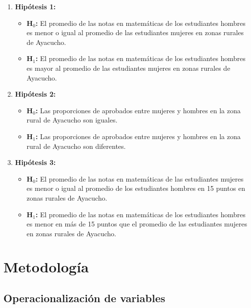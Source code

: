 \documentclass[
]{article}
\begin{document}
\begin{enumerate}
    \item \textbf{Hipótesis 1:}
    \begin{itemize}
        \item \textbf{H$_{0}$:} El promedio de las notas en matemáticas de los estudiantes hombres es menor o igual al promedio de las estudiantes mujeres en zonas rurales de Ayacucho.
        \item \textbf{H$_{1}$:} El promedio de las notas en matemáticas de los estudiantes hombres es mayor al promedio de las estudiantes mujeres en zonas rurales de Ayacucho.
    \end{itemize}
    \item \textbf{Hipótesis 2:}
    \begin{itemize}
        \item \textbf{H$_{0}$:} Las proporciones de aprobados entre mujeres y hombres en la zona rural de Ayacucho son iguales.
        \item \textbf{H$_{1}$:} Las proporciones de aprobados entre mujeres y hombres en la zona rural de Ayacucho son diferentes.
    \end{itemize}
    \item \textbf{Hipótesis 3:}
    \begin{itemize}
        \item \textbf{H$_{0}$:} El promedio de las notas en matemáticas de las estudiantes mujeres es menor o igual al promedio de los estudiantes hombres en 15 puntos en zonas rurales de Ayacucho.
        \item \textbf{H$_{1}$:} El promedio de las notas en matemáticas de los estudiantes hombres es menor en más de 15 puntos que el promedio de las estudiantes mujeres en zonas rurales de Ayacucho.
    \end{itemize}
\end{enumerate}

\section*{Metodología}\label{metodologuxeda}

\subsection*{Operacionalización de
variables}\label{operacionalizaciuxf3n-de-variables}
\end{document}
